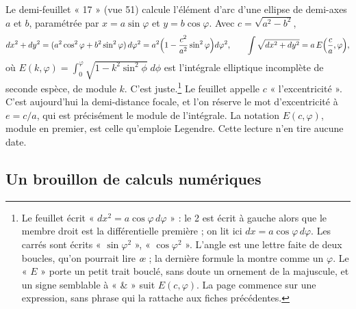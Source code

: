 \documentclass[11pt,a4paper]{article}
\begin{document}
Le demi-feuillet « 17 » (vue 51) calcule l'élément d'arc d'une ellipse de
demi-axes \(a\) et \(b\), paramétrée par \(x=a\sin\varphi\) et
\(y=b\cos\varphi\). Avec \(c=\sqrt{a^2-b^2}\),
\[
dx^2+dy^2=(a^2\cos^2\varphi+b^2\sin^2\varphi)\,d\varphi^2=a^2\Bigl(1-\frac{c^2}{a^2}\sin^2\varphi\Bigr)d\varphi^2,
\qquad
\int\sqrt{dx^2+dy^2}=a\,E\Bigl(\frac ca,\varphi\Bigr),
\]
où \(E(k,\varphi)=\int_0^\varphi\sqrt{1-k^2\sin^2\phi}\;d\phi\) est
l'intégrale elliptique incomplète de seconde espèce, de module \(k\). C'est
juste.\footnote{Le feuillet écrit « \(dx^2=a\cos\varphi\,d\varphi\) » : le 2 est
écrit à gauche alors que le membre droit est la différentielle première ; on
lit ici \(dx=a\cos\varphi\,d\varphi\). Les carrés sont écrits
« \(\sin\varphi^2\) », « \(\cos\varphi^2\) ». L'angle est une lettre faite de deux
boucles, qu'on pourrait lire \emph{œ} ; la dernière formule la montre comme un
\(\varphi\). Le « \(E\) » porte un petit trait bouclé, sans doute un ornement
de la majuscule, et un signe semblable à « \& » suit \(E(c,\varphi)\). La
page commence sur une expression, sans phrase qui la rattache aux fiches
précédentes.} Le feuillet appelle \(c\) « l'excentricité ». C'est
aujourd'hui la demi-distance focale, et l'on réserve le mot d'excentricité à
\(e=c/a\), qui est précisément le module de l'intégrale. La notation
\(E(c,\varphi)\), module en premier, est celle qu'emploie Legendre. Cette lecture
n'en tire aucune date.

\subsection*{Un brouillon de calculs numériques}
\end{document}
